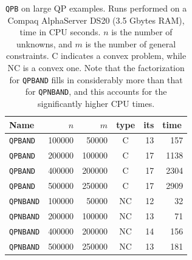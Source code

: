 \documentclass[twoside]{article}
\begin{document}
\begin{table}[ht]
\begin{center}
\begin{tabular}[c]{|lrrc|rr|}
\hline
Name      & $n$ & $m$ & type & its & time\, \\
\hline
{\tt QPBAND}  & 100000 & 50000  & C &   13  & {157} \\
{\tt QPBAND}  & 200000 & 100000 & C &   17  & {1138} \\
{\tt QPBAND}  & 400000 & 200000 & C &   17  & {2304} \\
{\tt QPBAND}  & 500000 & 250000 & C &   17  & {2909} \\
\hline
{\tt QPNBAND}  & 100000 & 50000  & NC &   12  & {32} \\
{\tt QPNBAND}  & 200000 & 100000 & NC &   13  & {71} \\
{\tt QPNBAND}  & 400000 & 200000 & NC &   14  & {156} \\
{\tt QPNBAND}  & 500000 & 250000 & NC &   13  & {181} \\
\hline
\end{tabular}
\end{center}
\caption{\label{figa} {\tt QPB} on large QP examples.
Runs performed on a Compaq AlphaServer DS20 (3.5 Gbytes RAM),
time in CPU seconds. $n$ is the number of unknowns, and 
$m$ is the number of general constraints. 
C indicates a convex problem, while NC is a convex one.
Note that the factorization for {\tt QPBAND} fills in 
considerably more than that for {\tt QPNBAND}, and this
accounts for the significantly higher CPU times.}
\end{table}
\end{document}
